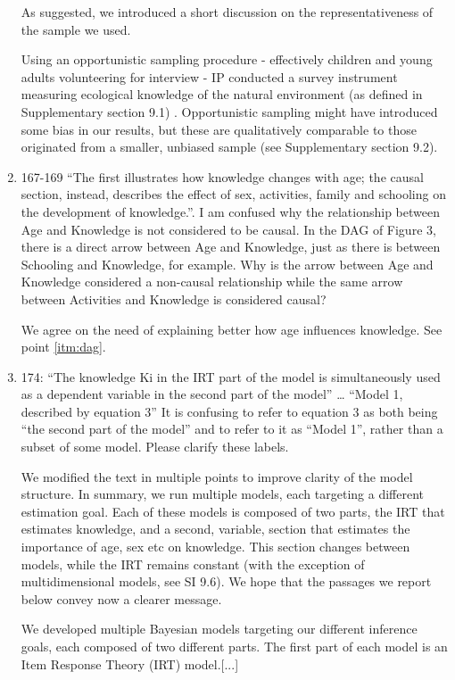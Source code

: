 \documentclass{article}
\newcommand{\rev}[1]{{\color{Red}#1}}
\newcommand{\comment}[1]{{\color{Blue}#1}}
\begin{document}
\begin{enumerate}
    \comment{As suggested, we introduced a short discussion on the representativeness of the sample we used.}

    \rev{Using an opportunistic sampling procedure - effectively children and young adults volunteering for interview - IP conducted a survey instrument measuring ecological knowledge of the natural environment (as defined in Supplementary section 9.1) . Opportunistic sampling might have introduced some bias in our results, but these are qualitatively comparable to those originated from a smaller, unbiased sample (see Supplementary section 9.2).} 

    \item 167-169 “The first illustrates how knowledge changes with age; the causal section, instead, describes the effect of sex, activities, family and schooling on the development of knowledge.”. I am confused why the relationship between Age and Knowledge is not considered to be causal. In the DAG of Figure 3, there is a direct arrow between Age and Knowledge, just as there is between Schooling and Knowledge, for example. Why is the arrow between Age and Knowledge considered a non-causal relationship while the same arrow between Activities and Knowledge is considered causal?
    
    \comment{We agree on the need of explaining better how age influences knowledge. See point \ref{itm:dag}.}

    \item 174: “The knowledge Ki in the IRT part of the model is simultaneously used as a dependent variable in the second part of the model” … “Model 1, described by equation 3” It is confusing to refer to equation 3 as both being “the second part of the model” and to refer to it as “Model 1”, rather than a subset of some model. Please clarify these labels.
    
    \comment{We modified the text in multiple points to improve clarity of the model structure. In summary, we run multiple models, each targeting a different estimation goal. Each of these models is composed of two parts, the IRT that estimates knowledge, and a second, variable, section that estimates the importance of age, sex etc on knowledge. This section changes between models, while the IRT remains constant (with the exception of multidimensional models, see SI 9.6). We hope that the passages we report below convey now a clearer message. }
    
    \rev{We developed multiple Bayesian models targeting our different inference goals, each composed of two different parts. The first part of each model is an Item Response Theory (IRT) model.[...]}
    

\end{enumerate}
\end{document}

